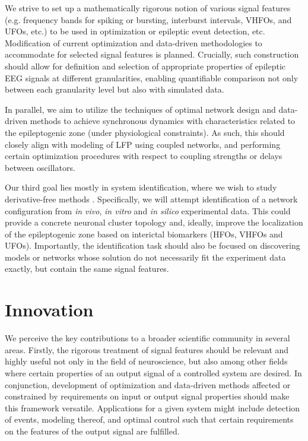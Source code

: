 \documentclass[a4paper,11pt]{scrartcl}
\begin{document}
We strive to set up a mathematically rigorous notion of various signal features (e.g. frequency bands for spiking or bursting, interburst intervals, VHFOs, and \acp{UFO}, etc.) \cite{Wedler2022} to be used in optimization or epileptic event detection, etc. Modification of current optimization and data-driven methodologies to accommodate for selected signal features is planned. Crucially, such construction should allow for definition and selection of appropriate properties of epileptic EEG signals at different granularities, enabling quantifiable comparison not only between each granularity level but also with simulated data.

In parallel, we aim to utilize the techniques of optimal network design and data-driven methods \cite{Baggio2021} to achieve synchronous dynamics with characteristics related to the epileptogenic zone (under physiological constraints). As such, this should closely align with modeling of LFP using coupled networks, and performing certain optimization procedures with respect to coupling strengths or delays between oscillators. 

Our third goal lies mostly in system identification, where we wish to study derivative-free methods \cite{Bortz2023, Messenger2024}. Specifically, we will attempt identification of a network configuration from \textit{in vivo}, \textit{in vitro} and \textit{in silico} experimental data. This could provide a concrete neuronal cluster topology and, ideally, improve the localization of the epileptogenic zone based on interictal biomarkers (HFOs, VHFOs and \acp{UFO}). Importantly, the identification task should also be focused on discovering models or networks whose solution do not necessarily fit the experiment data exactly, but contain the same signal features.

\section{Innovation}\label{sec:innovation}

We perceive the key contributions to a broader scientific community in several areas. Firstly, the rigorous treatment of signal features should be relevant and highly useful not only in the field of neuroscience, but also among other fields where certain properties of an output signal of a controlled system are desired. In conjunction, development of optimization and data-driven methods affected or constrained by requirements on input or output signal properties should make this framework versatile. Applications for a given system might include detection of events, modeling thereof, and optimal control such that certain requirements on the features of the output signal are fulfilled.
\end{document}
